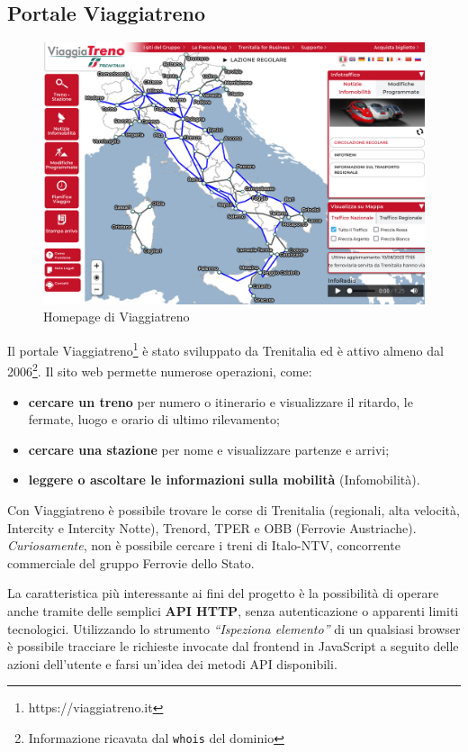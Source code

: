 \documentclass[12pt,a4paper,italian]{report}
\begin{document}
\subsection{Portale Viaggiatreno}
\label{viaggiatreno}

\begin{figure}[h] \centering
    \includegraphics[width=1\textwidth]{images/viaggiatreno.png}
	\caption{Homepage di Viaggiatreno}
\end{figure}

Il portale Viaggiatreno\footnote{https://viaggiatreno.it} è stato
sviluppato da Trenitalia ed è attivo almeno dal
2006\footnote{Informazione ricavata dal \texttt{whois} del dominio}.
Il sito web permette numerose operazioni, come:
\begin{itemize}
	\item \textbf{cercare un treno} per numero o itinerario e
    visualizzare il ritardo, le fermate, luogo e orario di ultimo
    rilevamento;
	\item \textbf{cercare una stazione} per nome e visualizzare
    partenze e arrivi;
	\item \textbf{leggere o ascoltare le informazioni sulla mobilità}
    (Infomobilità).
\end{itemize}

Con Viaggiatreno è possibile trovare le corse di Trenitalia
(regionali, alta velocità, Intercity e Intercity Notte), Trenord, TPER
e OBB (Ferrovie Austriache)\@.  \textit{Curiosamente}, non è possibile
cercare i treni di Italo-NTV, concorrente commerciale del gruppo
Ferrovie dello Stato.

La caratteristica più interessante ai fini del progetto è la
possibilità di operare anche tramite delle semplici \textbf{API HTTP},
senza autenticazione o apparenti limiti tecnologici.  Utilizzando lo
strumento \textit{``Ispeziona elemento''} di un qualsiasi browser è
possibile tracciare le richieste invocate dal frontend in JavaScript a
seguito delle azioni dell'utente e farsi un'idea dei metodi API
disponibili.
\end{document}
